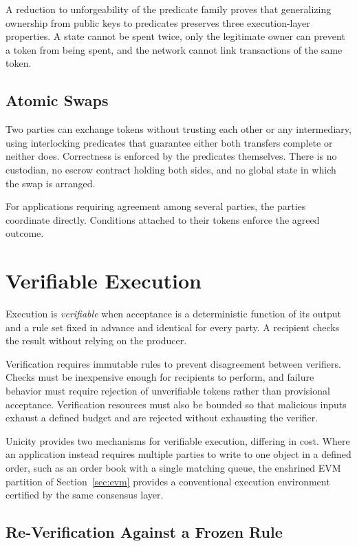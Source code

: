 A reduction to unforgeability of the predicate family proves that generalizing ownership from public keys to predicates preserves three execution-layer properties. A state cannot be spent twice, only the legitimate owner can prevent a token from being spent, and the network cannot link transactions of the same token.

\subsection{Atomic Swaps}

Two parties can exchange tokens without trusting each other or any intermediary, using interlocking predicates that guarantee either both transfers complete or neither does. Correctness is enforced by the predicates themselves. There is no custodian, no escrow contract holding both sides, and no global state in which the swap is arranged.

For applications requiring agreement among several parties, the parties coordinate directly. Conditions attached to their tokens enforce the agreed outcome.

\section{Verifiable Execution}\label{sec:verifiable}

Execution is \emph{verifiable} when acceptance is a deterministic function of its output and a rule set fixed in advance and identical for every party. A recipient checks the result without relying on the producer.

Verification requires immutable rules to prevent disagreement between verifiers. Checks must be inexpensive enough for recipients to perform, and failure behavior must require rejection of unverifiable tokens rather than provisional acceptance. Verification resources must also be bounded so that malicious inputs exhaust a defined budget and are rejected without exhausting the verifier.

Unicity provides two mechanisms for verifiable execution, differing in cost. Where an application instead requires multiple parties to write to one object in a defined order, such as an order book with a single matching queue, the enshrined EVM partition of Section~\ref{sec:evm} provides a conventional execution environment certified by the same consensus layer.

\subsection{Re-Verification Against a Frozen Rule}

